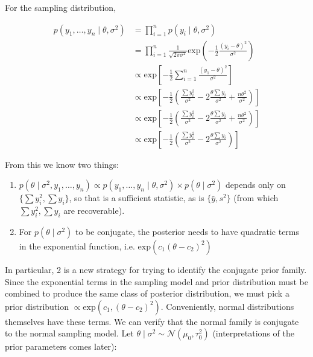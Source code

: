 \documentclass[]{article}
\providecommand{\tightlist}{%
  \setlength{\itemsep}{0pt}\setlength{\parskip}{0pt}}
\begin{document}
For the sampling distribution,

\begin{align}
p(y_1, \dots, y_n \mid \theta, \sigma^2) &= \prod_{i = 1}^n p(y_i \mid \theta, \sigma^2) \\
&= \prod_{i = 1}^n \frac{1}{\sqrt{2 \pi \sigma^2}} \text{exp}\left(-\frac{1}{2} \frac{(y_i - \theta)^2}{\sigma^2} \right) \\
&\propto \text{exp}\left[ -\frac{1}{2} \sum_{i = 1}^n \frac{(y_1 - \theta)^2}{\sigma^2} \right] \\
&\propto \text{exp}\left[ -\frac{1}{2} \left( \frac{\sum y_i^2}{\sigma^2} - 2 \frac{\theta \sum y_i}{\sigma^2} + \frac{n\theta^2}{\sigma^2} \right) \right] \\
&\propto \text{exp}\left[ -\frac{1}{2} \left( \frac{\sum y_i^2}{\sigma^2} - 2 \frac{\theta \sum y_i}{\sigma^2} + \frac{n\theta^2}{\sigma^2} \right) \right] \\
&\propto \text{exp}\left[ -\frac{1}{2} \left( \frac{\sum y_i^2}{\sigma^2} - 2 \frac{\theta \sum y_i}{\sigma^2} \right) \right]
\end{align}

From this we know two things:

\begin{enumerate}
\def\labelenumi{\arabic{enumi}.}
\tightlist
\item
  \(p(\theta \mid \sigma^2, y_1, \dots, y_n) \propto p(y_1, \dots, y_n \mid \theta, \sigma^2) \times p(\theta \mid \sigma^2)\)
  depends only on \(\{\sum y_i^2, \sum y_i\}\), so that is a sufficient
  statistic, as is \(\{\bar{y}, s^2\}\) (from which
  \(\sum y_i^2, \sum y_i\) are recoverable).
\item
  For \(p(\theta \mid \sigma^2)\) to be conjugate, the posterior needs
  to have quadratic terms in the exponential function, i.e.
  \(\text{exp}(c_1 (\theta - c_2)^2)\)
\end{enumerate}

In particular, 2 is a new strategy for trying to identify the conjugate
prior family. Since the exponential terms in the sampling model and
prior distribution must be combined to produce the same class of
posterior distribution, we must pick a prior distribution
\(\propto \text{exp}(c_1, (\theta - c_2)^2)\). Conveniently, normal
distributions themselves have these terms. We can verify that the normal
family is conjugate to the normal sampling model. Let
\(\theta \mid \sigma^2 \sim \mathcal{N}(\mu_0, \tau_0^2)\)
(interpretations of the prior parameters comes later):
\end{document}
